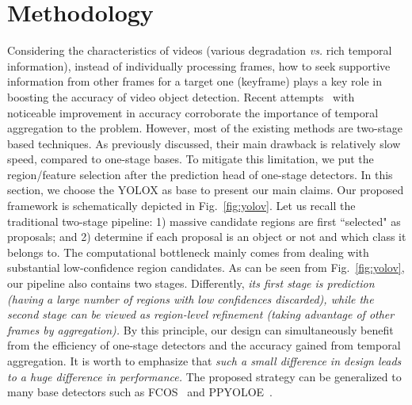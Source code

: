 \documentclass[letterpaper]{article} \usepackage{aaai23}  \usepackage{times}  \usepackage{helvet}  \usepackage{courier}  \usepackage[hyphens]{url}  \usepackage{graphicx} \urlstyle{rm} \def\UrlFont{\rm}  \usepackage{natbib}  \usepackage{caption} \usepackage{xcolor}
\begin{document}
\section{Methodology}

Considering the characteristics of videos (various degradation \emph{vs.} rich temporal information), instead of individually processing frames, how to seek supportive information from other frames for a target one (keyframe) plays a key role in boosting the accuracy of video object detection. Recent attempts~\cite{deng2019relation,chen2020memory,wu2019sequence,he2022queryprop} with noticeable improvement in accuracy corroborate the importance of temporal aggregation to the problem. However, most of the existing methods are two-stage based techniques. As previously discussed, their main drawback is relatively slow speed, compared to one-stage bases. To mitigate this limitation, we put the region/feature selection after the prediction head of one-stage detectors. In this section, we choose the YOLOX as base to present our main claims. Our proposed framework is schematically depicted in Fig.~\ref{fig:yolov}. Let us recall the traditional two-stage pipeline: 1) massive candidate regions are first ``selected" as proposals; and 2) determine if each proposal is an object or not and which class it belongs to. The computational bottleneck mainly comes from dealing with substantial low-confidence region candidates. As can be seen from Fig.~\ref{fig:yolov}, our pipeline also contains two stages. Differently, \emph{its first stage is prediction (having a large number of regions with low confidences discarded), while the second stage can be viewed as region-level refinement (taking advantage of other frames by aggregation).} By this principle, our design can simultaneously benefit from the efficiency of one-stage detectors and the accuracy gained from temporal aggregation. It is worth to emphasize that \emph{such a small difference in design leads to a huge difference in performance.} The proposed strategy can be generalized to many base detectors such as FCOS~\cite{tian2019fcos} and PPYOLOE~\cite{xu2022pp}. 
\end{document}
